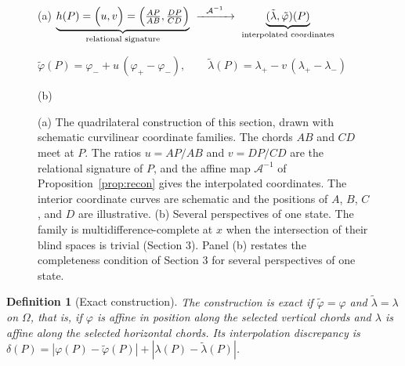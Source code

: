\documentclass[11pt]{article}
\newtheorem{definition}{Definition}
\theoremstyle{remark}
\begin{document}
\begin{figure}[!htbp]
\medskip
{\small (a)}\quad
$\displaystyle \underbrace{h(P)=\Bigl(u,v\Bigr)=\Bigl(\tfrac{AP}{AB},\tfrac{DP}{CD}\Bigr)}_{\text{relational signature}}
\ \xrightarrow{\ \ \mathcal A^{-1}\ \ }\
\underbrace{(\tilde\lambda,\tilde\varphi)(P)}_{\text{interpolated coordinates}}$

\medskip
$\tilde\varphi(P)=\varphi_-+u\,(\varphi_+-\varphi_-),\qquad \tilde\lambda(P)=\lambda_+-v\,(\lambda_+-\lambda_-)$

\bigskip
{}

\medskip
{\small (b)}
\caption{(a) The quadrilateral construction of this section, drawn with schematic curvilinear coordinate families. The chords $AB$ and $CD$ meet at $P$. The ratios $u=AP/AB$ and $v=DP/CD$ are the relational signature of $P$, and the affine map $\mathcal A^{-1}$ of Proposition~\ref{prop:recon} gives the interpolated coordinates. The interior coordinate curves are schematic and the positions of $A$, $B$, $C$, and $D$ are illustrative. (b) Several perspectives of one state. The family is multidifference-complete at $x$ when the intersection of their blind spaces is trivial (Section 3). Panel (b) restates the completeness condition of Section 3 for several perspectives of one state.}\label{fig:quad}
\end{figure}



\begin{definition}[Exact construction]
The construction is \emph{exact} if $\tilde\varphi=\varphi$ and $\tilde\lambda=\lambda$ on $\Omega$, that is, if $\varphi$ is affine in position along the selected vertical chords and $\lambda$ is affine along the selected horizontal chords. Its \emph{interpolation discrepancy} is $\delta(P)=|\varphi(P)-\tilde\varphi(P)|+|\lambda(P)-\tilde\lambda(P)|$.
\end{definition}
\end{document}
